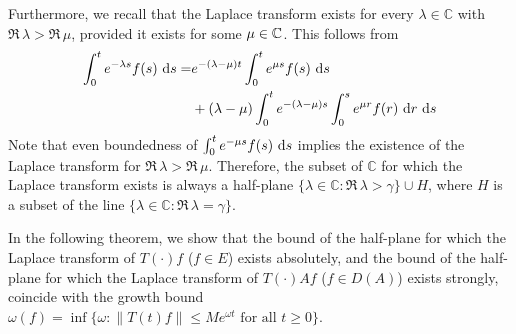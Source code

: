 

Furthermore, we recall that the Laplace transform exists for every $\lambda \in \mathbb{C}$ with $\Re\,\lambda > \Re\,\mu$, provided it exists for some $\mu\in\mathbb{C}$.
This follows from 
\begin{align}\label{eq:a4-1.1}
\int_0^t e^{-\lambda s} f(s)\,\mathop{}\!\mathrm{d}{s} = &e^{-(\lambda-\mu)t} \int_{0}^{t} e^{\mu s} f(s) \,\mathop{}\!\mathrm{d}{s} \\ &+ (\lambda - \mu) \int_{0}^{t} e^{-(\lambda-\mu)s} \int_{0}^{s} e^{\mu r} f(r) \,\mathop{}\!\mathrm{d}{r}\,\mathop{}\!\mathrm{d}{s} \notag
\end{align}
Note that even boundedness of $\int_{0}^{t} e^{-\mu s}f(s) \,\mathop{}\!\mathrm{d}{s}$ implies the existence of the Laplace transform for $\Re\,\lambda > \Re\,\mu$. 
Therefore, the subset of $\mathbb{C}$ for which the Laplace transform exists is always a half-plane 
$\{\lambda \in \mathbb{C} : \Re\,\lambda > \gamma\} \cup H$, where $H$ is a subset of the line $\{\lambda \in \mathbb{C} : \Re\,\lambda = \gamma\}$.



In the following theorem, we show that the bound of the half-plane for which the Laplace transform of $T(\cdot)f$ ($f \in E$) exists absolutely, and the bound of the half-plane for which the Laplace transform of $T(\cdot)Af$ ($f \in D(A)$) exists strongly, coincide with the growth bound $\omega(f) = \inf\{\omega : \|T(t)f\| \leq Me^{\omega t} \text{ for all } t \geq 0\}$.



